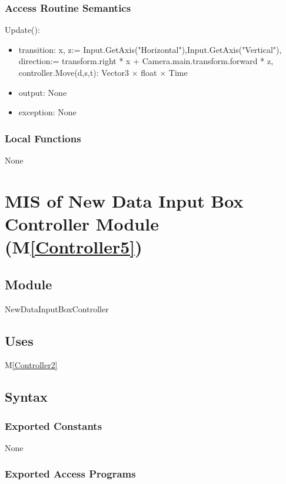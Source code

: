 \documentclass[12pt, titlepage]{article}
\newcommand{\mref}[1]{M\ref{#1}}
\begin{document}
\subsubsection{Access Routine Semantics}

\noindent Update():
\begin{itemize}
\item transition: x, z:= Input.GetAxis("Horizontal"),Input.GetAxis("Vertical"),\\
direction:= transform.right * x + Camera.main.transform.forward * z,\\
controller.Move(d,s,t): Vector3 $\times$ float $\times$ Time\\
\item output: None
\item exception: None 
\end{itemize}

\subsubsection{Local Functions}
None 

\newpage

 \section{MIS of New Data Input Box Controller Module (\mref{Controller5})}
 
\subsection{Module}
NewDataInputBoxController

\subsection{Uses}
\mref{Controller2}

\subsection{Syntax}

\subsubsection{Exported Constants}
None
\subsubsection{Exported Access Programs}
\end{document}
